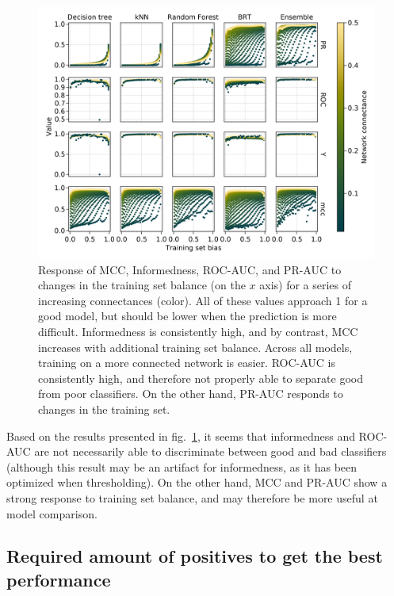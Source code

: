 \documentclass[11pt]{article}
\makeatletter
\def\maxwidth{\ifdim\Gin@nat@width>\linewidth\linewidth
\else\Gin@nat@width\fi}
\let\Oldincludegraphics\includegraphics
\renewcommand{\includegraphics}[1]{\Oldincludegraphics[width=\maxwidth]{#1}}
\makeatother
\begin{document}
\begin{figure}
\hypertarget{fig:biasco}{%
\centering
\includegraphics{figures/bias_by_connectance.png}
\caption{Response of MCC, Informedness, ROC-AUC, and PR-AUC to changes
in the training set balance (on the \(x\) axis) for a series of
increasing connectances (color). All of these values approach 1 for a
good model, but should be lower when the prediction is more difficult.
Informedness is consistently high, and by contrast, MCC increases with
additional training set balance. Across all models, training on a more
connected network is easier. ROC-AUC is consistently high, and therefore
not properly able to separate good from poor classifiers. On the other
hand, PR-AUC responds to changes in the training set.}\label{fig:biasco}
}
\end{figure}

Based on the results presented in fig.~\ref{fig:biasco}, it seems that
informedness and ROC-AUC are not necessarily able to discriminate
between good and bad classifiers (although this result may be an
artifact for informedness, as it has been optimized when thresholding).
On the other hand, MCC and PR-AUC show a strong response to training set
balance, and may therefore be more useful at model comparison.

\hypertarget{required-amount-of-positives-to-get-the-best-performance}{%
\subsection{Required amount of positives to get the best
performance}\label{required-amount-of-positives-to-get-the-best-performance}}
\end{document}
